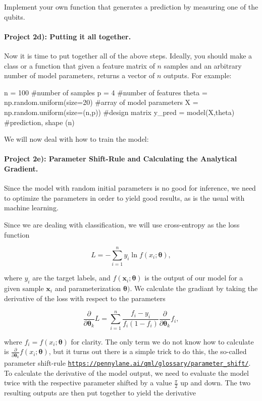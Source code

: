 \documentclass[%
oneside,                 %
final,                   %
10pt]{article}
\begin{document}
Implement your own function that generates a prediction by measuring one of the qubits.

\paragraph{Project 2d): Putting it all together.}
Now it is time to put together all of the above steps. Ideally, you
should make a class or a function that given a feature matrix of $n$
samples and an arbitrary number of model parameters, returns a vector
of $n$ outputs. For example:







\bpycod
n = 100 #number of samples
p = 4 #number of features
theta = np.random.uniform(size=20) #array of model parameters
X = np.random.uniform(size=(n,p)) #design matrix
y_pred = model(X,theta) #prediction, shape (n)

\epycod


We will now deal with how to train the model:

\paragraph{Project 2e): Parameter Shift-Rule and Calculating the Analytical Gradient.}
Since the model with random initial parameters is no good for
inference, we need to optimize the parameters in order to yield good
results, as is the usual with machine learning.

Since we are dealing with classification, we will use cross-entropy as the loss function

\begin{equation*}
    L = -\sum_{i=1}^{n}{y_i \ln{f(x_i;\boldsymbol{\theta})}},
\end{equation*}

where $y_i$ are the target labels, and
$f(\boldsymbol{x}_i;\boldsymbol{\theta})$ is the output of our model
for a given sample $\boldsymbol{x}_i$ and parameterization
$\boldsymbol{\theta})$. We calculate the gradiant by taking the
derivative of the loss with respect to the parameters

\begin{equation*}
    \frac{\partial}{\partial \boldsymbol{\theta}_k}L = \sum_{i=1}^{n}{\frac{f_i - y_i}{f_i(1 - f_i)}} \frac{\partial}{\partial \boldsymbol{\theta}_k}f_i,
\end{equation*}

where $f_i = f(x_i;\boldsymbol{\theta})$ for clarity. The only term we do not know how to calculate is $\frac{\partial}{\partial \boldsymbol{\theta}_k}f(x_i;\boldsymbol{\theta})$, but it turns out there is a simple trick to do this, the so-called parameter shift-rule \href{{https://pennylane.ai/qml/glossary/parameter_shift/}}{\nolinkurl{https://pennylane.ai/qml/glossary/parameter_shift/}}. To calculate the derivative of the model output, we need to evaluate the model twice with the respective parameter shifted by a value $\frac{\pi}{2}$ up and down. The two resulting outputs are then put together to yield the derivative
\end{document}
